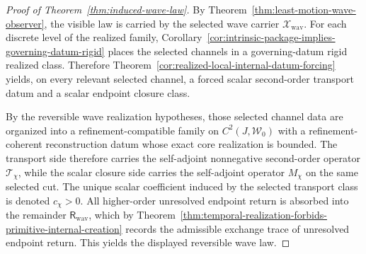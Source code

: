 \begin{proof}[Proof of Theorem~\ref{thm:induced-wave-law}]
\label{proof:thm:induced-wave-law}
By Theorem~\ref{thm:least-motion-wave-observer}, the visible law is carried by
the selected wave carrier \(\mathcal X_{\mathrm{wav}}\). For each discrete
level of the realized family,
Corollary~\ref{cor:intrinsic-package-implies-governing-datum-rigid} places the
selected channels in a governing-datum rigid realized class. Therefore
Theorem~\ref{cor:realized-local-internal-datum-forcing} yields, on every
relevant selected channel, a forced scalar second-order transport datum and a
scalar endpoint closure class.

By the reversible wave realization hypotheses, those selected channel data are
organized into a refinement-compatible family on \(C^2(J,\mathcal W_0)\) with
a refinement-coherent reconstruction datum whose exact core realization is
bounded. The transport side therefore carries the self-adjoint nonnegative
second-order operator \(\mathcal T_{\chi}\), while the scalar closure side
carries the self-adjoint operator \(M_{\chi}\) on the same selected cut. The
unique scalar coefficient induced by the selected transport class is denoted
\(c_{\chi}>0\). All higher-order unresolved endpoint return is absorbed into
the remainder \(\mathsf R_{\mathrm{wav}}\), which by
Theorem~\ref{thm:temporal-realization-forbids-primitive-internal-creation}
records the admissible exchange trace of unresolved endpoint return. This
yields the displayed reversible wave law.
\end{proof}

